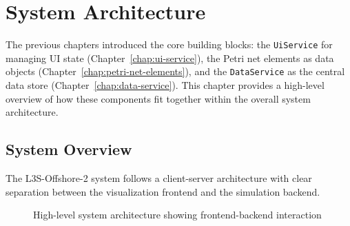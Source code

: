 \chapter{System Architecture}
\label{chap:architecture}

The previous chapters introduced the core building blocks: the \texttt{UiService} for managing UI state (Chapter~\ref{chap:ui-service}), the Petri net elements as data objects (Chapter~\ref{chap:petri-net-elements}), and the \texttt{DataService} as the central data store (Chapter~\ref{chap:data-service}). This chapter provides a high-level overview of how these components fit together within the overall system architecture.

\section{System Overview}
\label{sec:system-overview}

The L3S-Offshore-2 system follows a client-server architecture with clear separation between the visualization frontend and the simulation backend.

\begin{figure}[htb]
    \centering
    \caption{High-level system architecture showing frontend-backend interaction}
    \label{fig:system-architecture}
\end{figure}

